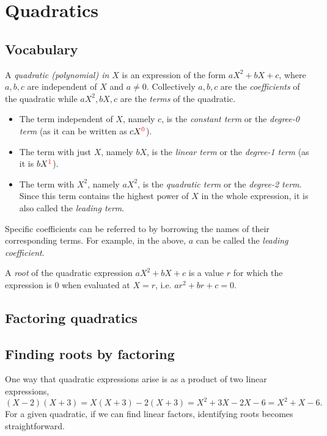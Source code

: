 \section{Quadratics}

\subsection{Vocabulary}

A \emph{quadratic (polynomial) in $X$} is an expression of the form $aX^2 + bX + c$, where $a,b,c$ are independent of $X$ and $a\neq 0$. Collectively $a,b,c$ are the \emph{coefficients} of the quadratic while $aX^2, bX, c$ are the \emph{terms} of the quadratic.
\begin{itemize}
\item The term independent of $X$, namely $c$, is the \emph{constant term} or the \emph{degree-0 term} (as it can be written as $cX^{\color{red}0}$).
\item The term with just $X$, namely $bX$, is the \emph{linear term} or the \emph{degree-1 term} (as it is $bX^{\color{red}1}$).
\item The term with $X^2$, namely $aX^2$, is the \emph{quadratic term} or the \emph{degree-2 term}. Since this term contains the highest power of $X$ in the whole expression, it is also called the \emph{leading term}.
\end{itemize}
Specific coefficients can be referred to by borrowing the names of their corresponding terms. For example, in the above, $a$ can be called the \emph{leading coefficient}.

A \emph{root} of the quadratic expression $aX^2 + bX + c$ is a value $r$ for which the expression is $0$ when evaluated at $X = r$, i.e. $ar^2 + br + c = 0$.

\subsection{Factoring quadratics}


\subsection{Finding roots by factoring}

One way that quadratic expressions arise is as a product of two linear expressions,
\begin{equation*}
(X - 2)(X + 3) = X(X + 3) - 2(X + 3) = X^2 + 3X - 2X - 6 = X^2 + X - 6. 
\end{equation*}
For a given quadratic, if we can find linear factors, identifying roots becomes straightforward.


